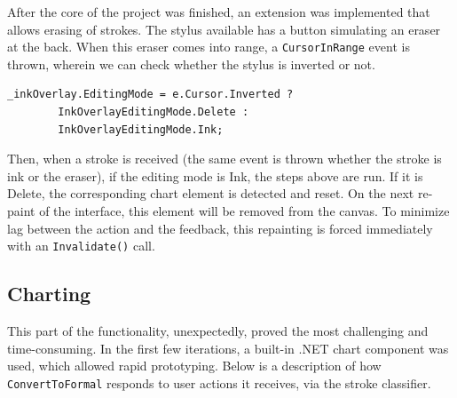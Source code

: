 	After the core of the project was finished, an extension was implemented that allows erasing of strokes. The stylus available has a button simulating an eraser at the back. When this eraser comes into range, a \texttt{CursorInRange} event is thrown, wherein we can check whether the stylus is inverted or not.
	
	\begin{lstlisting}[frame=single]
_inkOverlay.EditingMode = e.Cursor.Inverted ? 
		InkOverlayEditingMode.Delete : 
		InkOverlayEditingMode.Ink;
	\end{lstlisting}
	
	Then, when a stroke is received (the same event is thrown whether the stroke is ink or the eraser), if the editing mode is Ink, the steps above are run. If it is Delete, the corresponding chart element is detected and reset. On the next re-paint of the interface, this element will be removed from the canvas. To minimize lag between the action and the feedback, this repainting is forced immediately with an \texttt{Invalidate()} call.
	
	\subsection{Charting}
	This part of the functionality, unexpectedly, proved the most challenging and time-consuming. In the first few iterations, a built-in .NET chart component was used, which allowed rapid prototyping. Below is a description of how \texttt{ConvertToFormal} responds to user actions it receives, via the stroke classifier. 
	
